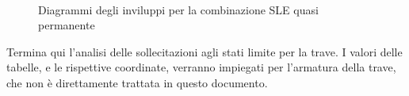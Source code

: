 \begin{figure}
	\centering
	\\
	\caption{Diagrammi degli inviluppi per la combinazione SLE quasi permanente}
	\label{fig:envelope_sleQP}
\end{figure}

Termina qui l'analisi delle sollecitazioni agli stati limite per la trave. I valori delle tabelle, e le rispettive coordinate, verranno impiegati per l'armatura della trave, che non è direttamente trattata in questo documento.
\cleardoublepage
